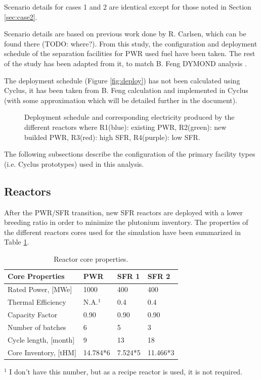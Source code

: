 \documentclass[12pt]{article}
\begin{document}
Scenario details for cases 1 and 2 are identical except for those noted in
Section \ref{sec:case2}.

Scenario details are based on previous work done by R. Carlsen, which
can be found there (TODO: where?).  From this study, the configuration and
deployment schedule of the separation facilities for PWR used fuel have been
taken. The rest of the study has been adapted from it, to match B. Feng DYMOND
analysis \cite{B.Feng_calculation}.

The deployment schedule (Figure \ref{fig:deploy}) has not been calculated
using Cyclus, it has been taken from B. Feng calculation and implemented in
Cyclus (with some approximation which will be detailed further in the
document).

\begin{figure}[h!]
    \centering
    \caption{
        Deployment schedule and corresponding electricity produced by the
        different reactors where R1(blue): existing PWR, R2(green): new
        builded PWR, R3(red): high SFR, R4(purple): low
        SFR.\label{fig:deployment}
    }
\end{figure}

The following subsections describe the configuration of the primary facility
types (i.e. Cyclus prototypes) used in this analysis.

\subsection{Reactors}

After the PWR/SFR transition, new SFR reactors are deployed with a lower
breeding ratio in order to minimize the plutonium inventory. The properties of
the different reactors cores used for the simulation have been summarized in
Table \ref{tab:reactor}.

\begin{table}[h!]
\centering
\begin{tabularx}{350pt}{lXXX}
\hline
Core Properties       &	PWR     &	SFR 1   &	SFR 2     \\
\hline
Rated Power, [MWe]    &	1000		&	400     &	400       \\
Thermal Efficiency    &	N.A.$^1$	&	0.4     &	0.4       \\
Capacity Factor       &	0.90		&	0.90		&	0.90      \\
Number of batches     &	6       &	5       &	3         \\
Cycle length, [month] &	9       &	13      &	18        \\
Core Inventory, [tHM] &	14.784*6&	7.524*5	&	11.466*3  \\
\hline
\end{tabularx}
\caption{Reactor core properties.}
\label{tab:reactor}
\footnotesize{$^1$ I don't have this number, but as a recipe reactor is used, it is not required.}
\end{table}
\end{document}
